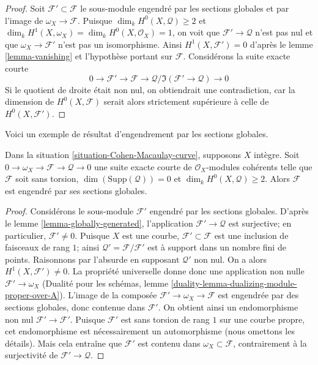 \begin{proof}
Soit $\mathcal{F}' \subset \mathcal{F}$ le sous-module engendré par les sections globales et par l'image de $\omega_X \to \mathcal{F}$. Puisque $\dim_k H^0(X, \mathcal{Q}) \geq 2$ et $\dim_k H^1(X, \omega_X) = \dim_k H^0(X, \mathcal{O}_X) = 1$, on voit que $\mathcal{F}' \to \mathcal{Q}$ n'est pas nul et que $\omega_X \to \mathcal{F}'$ n'est pas un isomorphisme. Ainsi $H^1(X, \mathcal{F}') = 0$ d'après le lemme \ref{lemma-vanishing} et l'hypothèse portant sur $\mathcal{F}$. Considérons la suite exacte courte $$
0 \to \mathcal{F}' \to \mathcal{F} \to
\mathcal{Q}/\Im(\mathcal{F}' \to \mathcal{Q}) \to 0
$$ Si le quotient de droite était non nul, on obtiendrait une contradiction, car la dimension de $H^0(X, \mathcal{F})$ serait alors strictement supérieure à celle de $H^0(X, \mathcal{F}')$.
\end{proof}

\noindent
Voici un exemple de résultat d'engendrement par les sections globales.

\begin{lemma}
\label{lemma-globally-generated-curve}
Dans la situation \ref{situation-Cohen-Macaulay-curve}, supposons $X$ intègre. Soit $0 \to \omega_X \to \mathcal{F} \to \mathcal{Q} \to 0$ une suite exacte courte de $\mathcal{O}_X$-modules cohérents telle que $\mathcal{F}$ soit sans torsion, $\dim(\text{Supp}(\mathcal{Q})) = 0$ et $\dim_k H^0(X, \mathcal{Q}) \geq 2$. Alors $\mathcal{F}$ est engendré par ses sections globales.
\end{lemma}

\begin{proof}
Considérons le sous-module $\mathcal{F}'$ engendré par les sections globales. D'après le lemme \ref{lemma-globally-generated}, l'application $\mathcal{F}' \to \mathcal{Q}$ est surjective; en particulier, $\mathcal{F}' \not = 0$. Puisque $X$ est une courbe, $\mathcal{F}' \subset \mathcal{F}$ est une inclusion de faisceaux de rang $1$; ainsi $\mathcal{Q}' = \mathcal{F}/\mathcal{F}'$ est à support dans un nombre fini de points. Raisonnons par l'absurde en supposant $\mathcal{Q}'$ non nul. On a alors $H^1(X, \mathcal{F}') \not = 0$. La propriété universelle donne donc une application non nulle $\mathcal{F}' \to \omega_X$ (Dualité pour les schémas, lemme \ref{duality-lemma-dualizing-module-proper-over-A}). L'image de la composée $\mathcal{F}' \to \omega_X \to \mathcal{F}$ est engendrée par des sections globales, donc contenue dans $\mathcal{F}'$. On obtient ainsi un endomorphisme non nul $\mathcal{F}' \to \mathcal{F}'$. Puisque $\mathcal{F}'$ est sans torsion de rang $1$ sur une courbe propre, cet endomorphisme est nécessairement un automorphisme (nous omettons les détails). Mais cela entraîne que $\mathcal{F}'$ est contenu dans $\omega_X \subset \mathcal{F}$, contrairement à la surjectivité de $\mathcal{F}' \to \mathcal{Q}$.
\end{proof}

